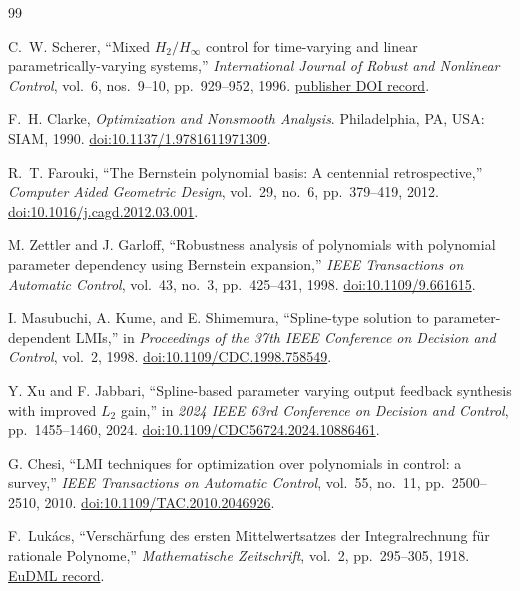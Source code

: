 \documentclass[11pt]{report}
\begin{document}
\appendix



\clearpage
{}
\begin{thebibliography}{99}

C.~W. Scherer, ``Mixed $H_2/H_\infty$ control for time-varying and linear parametrically-varying systems,'' \emph{International Journal of Robust and Nonlinear Control}, vol.~6, nos.~9--10, pp.~929--952, 1996. \href{https://doi.org/10.1002/\%28SICI\%291099-1239\%28199611\%296\%3A9\%2F10\%3C929\%3A\%3AAID-RNC260\%3E3.0.CO\%3B2-9}{publisher DOI record}.

F.~H. Clarke, \emph{Optimization and Nonsmooth Analysis}. Philadelphia, PA, USA: SIAM, 1990. \href{https://doi.org/10.1137/1.9781611971309}{doi:10.1137/1.9781611971309}.

R.~T. Farouki, ``The Bernstein polynomial basis: A centennial retrospective,'' \emph{Computer Aided Geometric Design}, vol.~29, no.~6, pp.~379--419, 2012. \href{https://doi.org/10.1016/j.cagd.2012.03.001} {doi:10.1016/j.cagd.2012.03.001}.

M. Zettler and J. Garloff, ``Robustness analysis of polynomials with polynomial parameter dependency using Bernstein expansion,'' \emph{IEEE Transactions on Automatic Control}, vol.~43, no.~3, pp.~425--431, 1998. \href{https://doi.org/10.1109/9.661615}{doi:10.1109/9.661615}.

I. Masubuchi, A. Kume, and E. Shimemura, ``Spline-type solution to parameter-dependent LMIs,'' in \emph{Proceedings of the 37th IEEE Conference on Decision and Control}, vol.~2, 1998. \href{https://doi.org/10.1109/CDC.1998.758549} {doi:10.1109/CDC.1998.758549}.

Y. Xu and F. Jabbari, ``Spline-based parameter varying output feedback synthesis with improved $L_2$ gain,'' in \emph{2024 IEEE 63rd Conference on Decision and Control}, pp.~1455--1460, 2024. \href{https://doi.org/10.1109/CDC56724.2024.10886461} {doi:10.1109/CDC56724.2024.10886461}.

G. Chesi, ``LMI techniques for optimization over polynomials in control: a survey,'' \emph{IEEE Transactions on Automatic Control}, vol.~55, no.~11, pp.~2500--2510, 2010. \href{https://doi.org/10.1109/TAC.2010.2046926} {doi:10.1109/TAC.2010.2046926}.

F.~Luk\'acs, ``Versch\"arfung des ersten Mittelwertsatzes der Integralrechnung f\"ur rationale Polynome,'' \emph{Mathematische Zeitschrift}, vol.~2, pp.~295--305, 1918. \href{https://eudml.org/doc/167484}{EuDML record}.


\end{thebibliography}
\end{document}
